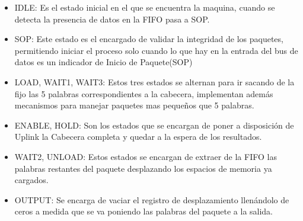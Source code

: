 \begin{itemize}
	\item IDLE: Es el estado inicial en el que se encuentra la maquina, cuando se detecta la presencia de datos en la FIFO pasa a SOP.
	\item SOP: Este estado es el encargado de validar la integridad de los paquetes, permitiendo iniciar el proceso solo cuando lo que hay en la entrada del bus de datos es un indicador de Inicio de Paquete(SOP)
	\item LOAD, WAIT1, WAIT3: Estos tres estados se alternan para ir sacando de la fijo las 5 palabras correspondientes a la cabecera, implementan además mecanismos para manejar paquetes mas pequeños que 5 palabras.
	\item ENABLE, HOLD: Son los estados que se encargan de poner a disposición de Uplink la Cabecera completa y quedar a la espera de los resultados.
	\item WAIT2, UNLOAD: Estos estados se encargan de extraer de la FIFO las palabras restantes del paquete desplazando los espacios de memoria ya cargados. 
	\item OUTPUT: Se encarga de vaciar el registro de desplazamiento llenándolo de ceros a medida que se va poniendo las palabras del paquete a la salida. 
\end{itemize}

